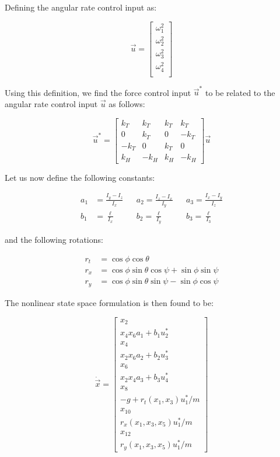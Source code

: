 Defining the angular rate control input as:

\begin{equation}
	\vec{u} = 
	\begin{bmatrix}
		\omega_1^2 \\ \omega_2^2 \\ \omega_3^2 \\ \omega_4^2 \\
	\end{bmatrix}
\end{equation}

Using this definition, we find the force control input $\vec{u}^*$ to be related to the angular rate control input $\vec{u}$ as follows:

\begin{equation}
	\vec{u}^* =
	\begin{bmatrix}
		k_T & k_T & k_T & k_T \\
		0 & k_T & 0 & - k_T \\
		- k_T & 0 & k_T & 0 \\
		k_H & - k_H & k_H & - k_H
	\end{bmatrix}
	\vec{u}
\end{equation}

Let us now define the following constants:

\begin{align}
	a_1 &= \frac{I_y - I_z}{I_x} && a_2 = \frac{I_z - I_x}{I_y} && a_3 = \frac{I_x - I_y}{I_z} \\
	b_1 &= \frac{\ell}{I_x} &&b_2 = \frac{\ell}{I_y} &&b_3 = \frac{\ell}{I_3}
\end{align}

and the following rotations:

\begin{equation}\label{eq:rotations}
\begin{split}
	r_t &= \cos\phi \cos\theta \\
	r_x &= \cos\phi \sin\theta \cos\psi + \sin\phi \sin\psi \\
	r_y &= \cos\phi \sin\theta \sin\psi - \sin\phi \cos\psi 
\end{split}
\end{equation}

The nonlinear state space formulation is then found to be:

\begin{equation}\label{eq:nonlinearss}
	\dot{\vec{x}} =
	\begin{bmatrix}
		x_2 \\
		x_4 x_6 a_1 + b_1 u^*_2 \\
		x_4 \\
		x_2 x_6 a_2 + b_2 u^*_3 \\
		x_6 \\
		x_2 x_4 a_3 + b_3 u^*_4 \\
		x_8 \\
		-g + r_t(x_1, x_3) u^*_1 / m \\
		x_{10} \\
		r_x(x_1, x_3, x_5) u^*_1 / m \\
		x_{12} \\
		r_y(x_1, x_3, x_5) u^*_1 / m 
	\end{bmatrix}
\end{equation}

